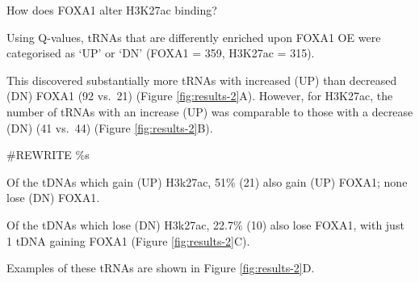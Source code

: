 \documentclass[
  12pt,
]{article}
\begin{document}
How does FOXA1 alter H3K27ac binding?

Using Q-values, tRNAs that are differently enriched upon FOXA1 OE were categorised as `UP' or `DN' (FOXA1 = 359, H3K27ac = 315).

This discovered substantially more tRNAs with increased (UP) than decreased (DN) FOXA1 (92 vs.~21) (Figure \ref{fig:results-2}A).
However, for H3K27ac, the number of tRNAs with an increase (UP) was comparable to those with a decrease (DN) (41 vs.~44) (Figure \ref{fig:results-2}B).

\#REWRITE \%s

Of the tDNAs which gain (UP) H3k27ac, 51\% (21) also gain (UP) FOXA1; none lose (DN) FOXA1.

Of the tDNAs which lose (DN) H3k27ac, 22.7\% (10) also lose FOXA1, with just 1 tDNA gaining FOXA1 (Figure \ref{fig:results-2}C).

Examples of these tRNAs are shown in Figure \ref{fig:results-2}D.

\hypertarget{section}{%
\subsubsection{}\label{section}}
\end{document}
